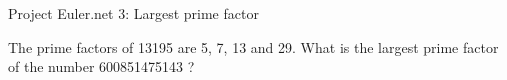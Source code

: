 Project Euler.net 3: Largest prime factor

The prime factors of 13195 are 5, 7, 13 and 29. What is the largest prime factor of the number 600851475143 ?


